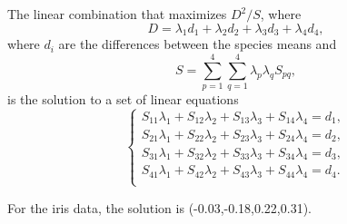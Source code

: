 \documentclass[aoas]{imsart}
\numberwithin{equation}{section}
\theoremstyle{plain}
\theoremstyle{remark}
\begin{document}
The linear combination that maximizes \(D^2/S\), where \begin{equation}
D = \lambda_1 d_1 +\lambda_2 d_2+\lambda_3 d_3+\lambda_4 d_4,
\end{equation} where \(d_i\) are the differences between the species
means and \begin{equation}
S = \sum_{p=1}^4\sum_{q=1}^4 \lambda_p\lambda_qS_{pq},
\end{equation} is the solution to a set of linear equations
\begin{equation}
\begin{cases}
S_{11}\lambda_1 + S_{12}\lambda_2 + S_{13}\lambda_3 + S_{14}\lambda_4 = d_1, \\
S_{21}\lambda_1 + S_{22}\lambda_2 + S_{23}\lambda_3 + S_{24}\lambda_4 = d_2, \\ 
S_{31}\lambda_1 + S_{32}\lambda_2 + S_{33}\lambda_3 + S_{34}\lambda_4 = d_3, \\ 
S_{41}\lambda_1 + S_{42}\lambda_2 + S_{43}\lambda_3 + S_{44}\lambda_4 = d_4. \\ 
\end{cases}
\end{equation}

For the iris data, the solution is (-0.03,-0.18,0.22,0.31).



\end{document}
